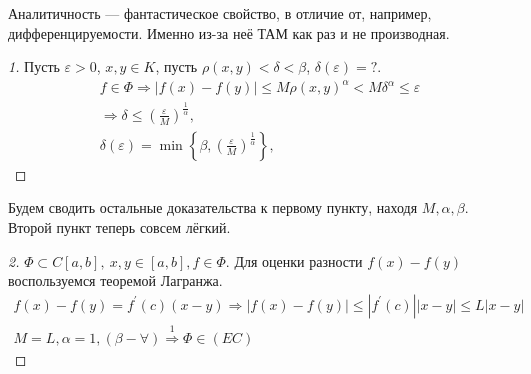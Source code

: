 \documentclass[document]{subfiles}
\begin{document}
Аналитичность --- фантастическое свойство, в отличие от, например, дифференцируемости. Именно из-за неё ТАМ как раз и не производная.

\begin{proof}[1]
    Пусть $\varepsilon > 0$, $x, y \in K$, пусть $\rho(x,y) < \delta < \beta$, $\delta(\varepsilon) = ?$. 
    \begin{gather*}
        f \in \Phi \Rightarrow |f(x) - f(y)| \leq M \rho(x,y)^\alpha < M \delta^\alpha \leq \varepsilon \\
        \Rightarrow \delta \leq \left( \frac{\varepsilon}{M} \right)^{\frac{1}{\alpha}}, \\
        \delta(\varepsilon) = \min \left\{ \beta, \left( \frac{\varepsilon}{M} \right)^{\frac{1}{\alpha}} \right\},
    \end{gather*}
\end{proof}

Будем сводить остальные доказательства к первому пункту, находя $M, \alpha, \beta$. Второй пункт теперь совсем лёгкий. 
\begin{proof}[2]
    $\Phi \subset C[a,b], \: x,y \in [a,b], f \in \Phi$. Для оценки разности $f(x) - f(y)$ воспользуемся теоремой Лагранжа. 
    \begin{multline*}
        f(x) - f(y) = f^\prime(c)(x-y) \Rightarrow |f(x) - f(y)| \leq |f^\prime(c)||x-y| \leq L|x-y| \\
        M = L, \alpha = 1, (\beta - \forall) \stackrel{1}{\Rightarrow} \Phi \in (EC)
    \end{multline*}
\end{proof}
\end{document}

